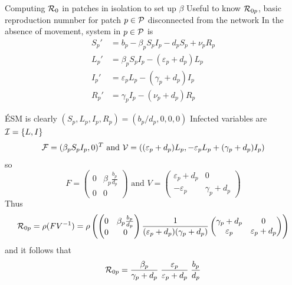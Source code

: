 \documentclass[aspectratio=169]{beamer}\usepackage[]{graphicx}\usepackage[]{xcolor}
\begin{document}
\begin{frame}{Computing $\R_0$ in patches in isolation to set up $\beta$}
Useful to know $\R_{0p}$, basic reproduction numnber for patch $p\in\P$ disconnected from the network
\vfill
In the absence of movement, system in $p\in\P$ is
\begin{subequations}
	\label{sys:pSLIRS_toy_isolated}
	\begin{align}
		S_{p}' &=b_p-\beta_pS_pI_p-d_pS_p+\nu_pR_p 
		\label{sys:pSLIRS_toy_isolated_dS} \\
		L_{p}' &=\beta_pS_pI_p-\left( \varepsilon_{p}+d_{p}\right)L_{p}
		\label{sys:pSLIRS_toy_isolated_dL} \\
		I_{p}' &=\varepsilon_pL_p-(\gamma_p+d_p)I_p
		\label{sys:pSLIRS_toy_isolated_dI} \\
		R_{p}' &=\gamma _{p}I_{p}-\left(\nu_{p}+d_{p}\right)R_{p}
		\label{sys:pSLIRS_toy_isolated_dR} 
	\end{align}
\end{subequations}
\end{frame}

\begin{frame}
ÉSM is clearly $(S_p,L_p,I_p,R_p)=(b_p/d_p,0,0,0)$
\vfill
Infected variables are $\I=\{L,I\}$
\vfill
\[
\F = (\beta_p S_pI_p,0)^T
\text{ and }
\V = ((\varepsilon_p+d_p)L_p,-\varepsilon_pL_p+(\gamma_p+d_p)I_p)
\]
so
\[
F=\begin{pmatrix}
0 & \beta_p\frac{b_p}{d_p} \\ 0 & 0
\end{pmatrix}
\text{ and }
V=\begin{pmatrix}
\varepsilon_p+d_p & 0 \\
-\varepsilon_p & \gamma_p+d_p
\end{pmatrix}
\]
\vfill
Thus
\[
\R_{0p} = 
\rho(FV^{-1})
=\rho\left(
\begin{pmatrix}
0 & \beta_p\frac{b_p}{d_p} \\ 0 & 0
\end{pmatrix}
\frac{1}{(\varepsilon_p+d_p)(\gamma_p+d_p)}
\begin{pmatrix}
\gamma_p+d_p & 0 \\
\varepsilon_p & \varepsilon_p+d_p
\end{pmatrix}
\right)
\]
and it follows that
\begin{equation}\label{eq:R0p}
\R_{0p}=
\frac{\beta_p}{\gamma_p+d_p}\;
\frac{\varepsilon_p}{\varepsilon_p+d_p}\;
\frac{b_p}{d_p}
\end{equation}
\end{frame}
\end{document}
